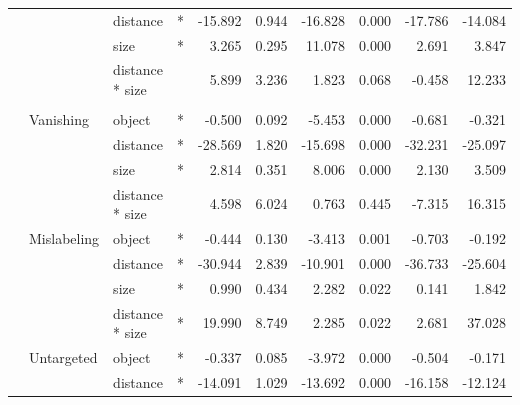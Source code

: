 \documentclass[
]{article}
\begin{document}
\begin{longtable}[t]{llllrrrrrr}
\cmidrule{3-10}\nopagebreak
\hspace{1em} &  & distance & * & -15.892 & 0.944 & -16.828 & 0.000 & -17.786 & -14.084\\
\cmidrule{3-10}\nopagebreak
\hspace{1em} &  & size & * & 3.265 & 0.295 & 11.078 & 0.000 & 2.691 & 3.847\\
\cmidrule{3-10}\nopagebreak
\hspace{1em} &  & distance * size &  & 5.899 & 3.236 & 1.823 & 0.068 & -0.458 & 12.233\\
\cmidrule{1-10}\pagebreak[0]
\addlinespace[0.3em]
\multicolumn{10}{l}{\textbf{RetinaNet}}\\
\hspace{1em} & Vanishing & object & * & -0.500 & 0.092 & -5.453 & 0.000 & -0.681 & -0.321\\
\cmidrule{3-10}\nopagebreak
\hspace{1em} &  & distance & * & -28.569 & 1.820 & -15.698 & 0.000 & -32.231 & -25.097\\
\cmidrule{3-10}\nopagebreak
\hspace{1em} &  & size & * & 2.814 & 0.351 & 8.006 & 0.000 & 2.130 & 3.509\\
\cmidrule{3-10}\nopagebreak
\hspace{1em} &  & distance * size &  & 4.598 & 6.024 & 0.763 & 0.445 & -7.315 & 16.315\\
\cmidrule{2-10}\nopagebreak
\hspace{1em} & Mislabeling & object & * & -0.444 & 0.130 & -3.413 & 0.001 & -0.703 & -0.192\\
\cmidrule{3-10}\nopagebreak
\hspace{1em} &  & distance & * & -30.944 & 2.839 & -10.901 & 0.000 & -36.733 & -25.604\\
\cmidrule{3-10}\nopagebreak
\hspace{1em} &  & size & * & 0.990 & 0.434 & 2.282 & 0.022 & 0.141 & 1.842\\
\cmidrule{3-10}\nopagebreak
\hspace{1em} &  & distance * size & * & 19.990 & 8.749 & 2.285 & 0.022 & 2.681 & 37.028\\
\cmidrule{2-10}\nopagebreak
\hspace{1em} & Untargeted & object & * & -0.337 & 0.085 & -3.972 & 0.000 & -0.504 & -0.171\\
\cmidrule{3-10}\nopagebreak
\hspace{1em} &  & distance & * & -14.091 & 1.029 & -13.692 & 0.000 & -16.158 & -12.124\\

\end{longtable}
\end{document}
